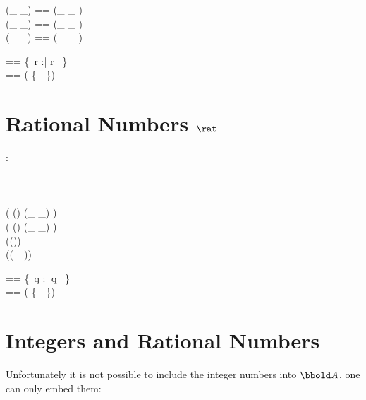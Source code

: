 \documentclass[12pt]{scrartcl}
\begin{document}
\begin{zed}
  (\_ \aleq \_) == (\_ \alt \_ ) \cup \id \real \\
  (\_ \agt \_) == (\_ \alt \_ ) \inv \\
  (\_ \ageq \_) == (\_ \agt \_ ) \cup \id \real \\
\end{zed}

\begin{zed}
  \realplus == \{~r :\real | r \agt \azero~\}\\
  \realminus == \real \setminus ( \realplus \cup \{~\azero~\})
\end{zed}

\section{Rational Numbers $\rat$}
\label{sec:rational-numbers}

\begin{axdef}
  \rat : \power \real
  \where
  \azero \in \rat\\
  \aone \in \rat\\
  \atwo \in \rat\\
  \aten \in \rat\\
  \ran ( (\rat \cross \rat) \dres (\_ \aplus \_) ) \subset \rat\\
  \ran ( (\rat \cross \rat) \dres (\_ \amult \_) ) \subset \rat\\
  \ran (\rat \dres (\aneg ))  \subset \rat\\
  \ran (\rat \dres (\_ \ainv ))  \subset \rat\\
\end{axdef}

\begin{zed}
  \ratplus == \{~q :\rat | q \agt \azero~\}\\
  \ratminus == \rat \setminus ( \ratplus \cup \{~\azero~\})
\end{zed}

\section{Integers and Rational Numbers}
\label{sec:integers-and-rationals}
Unfortunately it is not possible to include the integer numbers into
$\arithmos$, one can only embed them:

\end{document}
